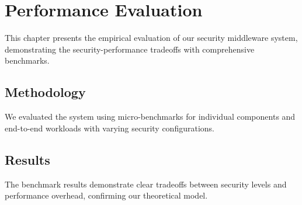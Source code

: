 \chapter{Performance Evaluation}
This chapter presents the empirical evaluation of our security middleware system,
demonstrating the security-performance tradeoffs with comprehensive benchmarks.

\section{Methodology}
We evaluated the system using micro-benchmarks for individual components and
end-to-end workloads with varying security configurations.

\section{Results}
The benchmark results demonstrate clear tradeoffs between security levels and
performance overhead, confirming our theoretical model.
